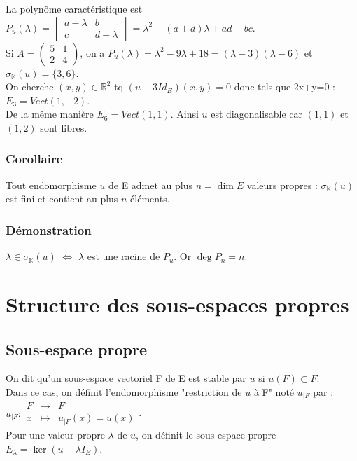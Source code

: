 \documentclass[a4paper,10pt]{book} %
\newcommand{\R}{\mathbb{R}}
\newcommand{\K}{\mathbb{K}}
\newcommand{\sev}{sous-espace vectoriel }
\begin{document}
La polynôme caractéristique est
$P_u(\lambda)=\begin{vmatrix}
a-\lambda&b\\
c&d-\lambda
\end{vmatrix}=\lambda^2-(a+d)\lambda + ad-bc$.\\

Si $A=\begin{pmatrix}
5&1\\2&4
\end{pmatrix}$, on a
$P_u(\lambda)=\lambda^2-9\lambda+18=(\lambda-3)(\lambda-6)$ et $\sigma_{\K}(u)=\{3,6\}$.\\

On cherche $(x,y)\in \R^2$ tq $(u-3Id_E)(x,y)=0$ donc tels que 2x+y=0 : $E_3=Vect(1,-2)$.\\
De la même manière $E_6=Vect(1,1)$.
Ainsi $u$ est diagonalisable car $(1,1)$ et $(1,2)$ sont libres.

\subsubsection{Corollaire}
Tout endomorphisme $u$ de E admet au plus $n=\dim E$ valeurs propres :  $\sigma_{\K}(u)$ est fini et contient au plus $n$ éléments.

\subsubsection{Démonstration}
$\lambda \in \sigma_{\K}(u)$ $\Leftrightarrow$ $\lambda$ est une racine de $P_u$. Or $\deg P_n=n$.

\section{Structure des sous-espaces propres}
\subsection{Sous-espace propre}
On dit qu'un \sev F de E est stable par $u$ si $u(F)\subset F$.\\
Dans ce cas, on définit l'endomorphisme "restriction de $u$ à F" noté $u_{|F}$ par :
$u_{|F} :\begin{array}{lll}
F&\rightarrow&F\\
x&\mapsto&u_{|F}(x)=u(x)
\end{array}$.\\

Pour une valeur propre $\lambda$ de $u$, on définit le sous-espace propre $E_\lambda=\ker(u-\lambda I_E)$.
\end{document}
